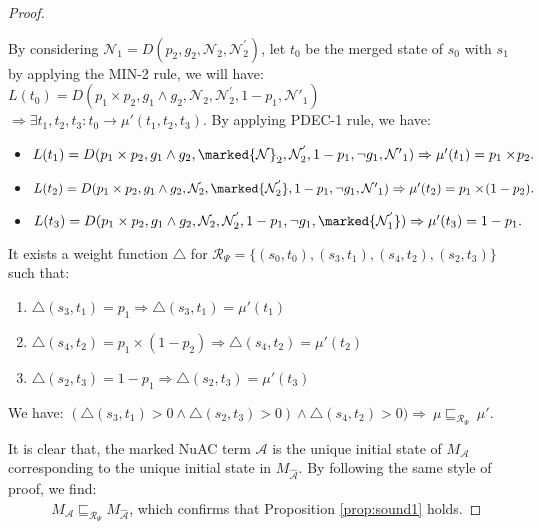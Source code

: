\begin{proof}
\begin{itemize}
By considering $\mathcal{N}_{1}=D(p_{2},g_{2},\mathcal{N}_{2},\mathcal{N}^{'}_{2})$, let $t_0$ be the merged state of $s_0$ with $s_1$ by applying the MIN-2 rule, we will have:\\
$L(t_0)=D(p_{1}\times p_{2},g_{1}\wedge g_{2},\mathcal{N}_{2},\mathcal{N}^{'}_{2},1-p_{1},\mathcal{N'}_{1})$
$\Rightarrow\exists t_1, t_2, t_3: t_0\rightarrow \mu'(t_1,t_2,t_3)$. By applying PDEC-1 rule, we have:
\begin{itemize}
  \item $L(t_1)=D(p_{1}\times p_{2},g_{1}\wedge g_{2},\marked{\mathcal{N}}_{2},\mathcal{N}^{'}_{2},1-p_{1},\neg g_{1},\mathcal{N'}_{1})\Rightarrow\mu'(t_1)=p_{1}\times\!p_{2}.$
  \item $L(t_2)=D(p_{1}\times p_{2},g_{1}\wedge g_{2},\mathcal{N}_{2},\marked{\mathcal{N}^{'}_{2}},1-p_{1},\neg g_{1},\mathcal{N'}_{1})\Rightarrow\mu'(t_2)=p_{1}\times\!(1-p_{2}).$
  \item $L(t_3)=D(p_{1}\times p_{2},g_{1}\wedge g_{2},\mathcal{N}_{2},\mathcal{N}^{'}_{2},1-p_{1},\neg g_{1},\marked{\mathcal{N}^{'}_{1}})\Rightarrow\mu'(t_3)=1-p_{1}.$
\end{itemize}
It exists a weight function $\triangle$ for $\mathscr{R}_\Psi=\{(s_0,t_0),(s_3,t_1),(s_4,t_2),(s_2,t_3)\}$ such that:
\begin{enumerate}
  \item $\triangle(s_{3},t_{1})=p_1\Rightarrow\triangle(s_{3},t_{1})=\mu'(t_1)$
  \item $\triangle(s_{4},t_{2})=p_1\times (1-p_2)\Rightarrow\triangle(s_{4},t_{2})=\mu'(t_2)$
  \item $\triangle(s_{2},t_{3})=1-p_1\Rightarrow\triangle(s_{2},t_{3})=\mu'(t_3)$
\end{enumerate}
We have: $(\triangle(s_{3},t_{1})>0\wedge\triangle(s_{2},t_{3})>0)\wedge\triangle(s_{4},t_{2})>0)\Rightarrow~\mu\sqsubseteq_{\mathscr{R}_\Psi}~\mu'$.
\end{itemize}
It is clear that, the marked NuAC term $\mathcal{A}$ is the unique initial state of $M_{\mathcal{A}}$ corresponding to the unique initial state in $M_{\widehat{\mathcal{A}}}$. By following the same style of proof, we find: \\ $~~~~~~~~~~~~~~M_\mathcal{{A}}\sqsubseteq_{\mathscr{R}_\Psi}M_\mathcal{{\widehat{A}}}$, which confirms that Proposition \ref{prop:sound1} holds.
\end{proof}
